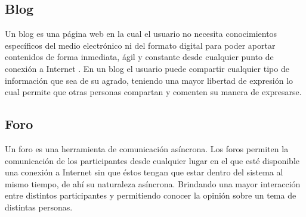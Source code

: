 
\subsection{Blog}

Un blog es una página web en la cual el usuario no necesita conocimientos específicos del medio electrónico ni del 
formato digital para poder aportar contenidos de forma inmediata, ágil y constante desde cualquier punto de conexión 
a Internet \citep{CT17}. En un blog el usuario puede compartir cualquier tipo de información que sea de su agrado, 
teniendo una mayor libertad de expresión lo cual permite que otras personas compartan y comenten su manera de expresarse.


\subsection{Foro}

Un foro es una herramienta de comunicación asíncrona. Los foros permiten la comunicación de los participantes desde 
cualquier lugar en el que  esté  disponible  una  conexión  a Internet  sin  que  éstos  tengan  que  estar dentro del 
sistema al mismo tiempo, de ahí su naturaleza asíncrona. Brindando una mayor interacción entre distintos 
participantes y permitiendo conocer la opinión sobre un tema de distintas personas.

